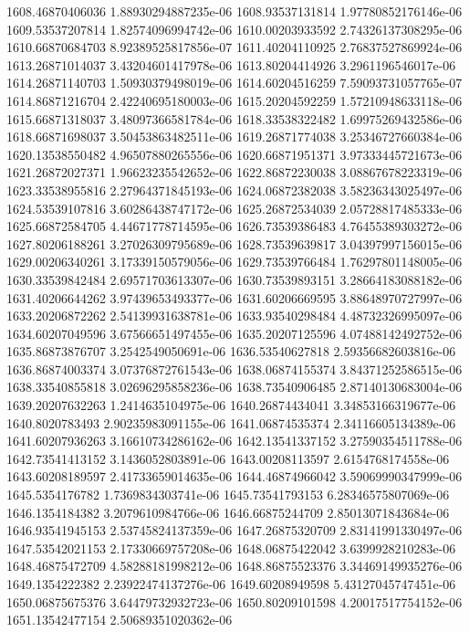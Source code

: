 {1608.46870406036 1.88930294887235e-06
1608.93537131814 1.97780852176146e-06
1609.53537207814 1.82574096994742e-06
1610.00203933592 2.74326137308295e-06
1610.66870684703 8.92389525817856e-07
1611.40204110925 2.76837527869924e-06
1613.26871014037 3.43204601417978e-06
1613.80204414926 3.2961196546017e-06
1614.26871140703 1.50930379498019e-06
1614.60204516259 7.59093731057765e-07
1614.86871216704 2.42240695180003e-06
1615.20204592259 1.57210948633118e-06
1615.66871318037 3.48097366581784e-06
1618.33538322482 1.69975269432586e-06
1618.66871698037 3.50453863482511e-06
1619.26871774038 3.25346727660384e-06
1620.13538550482 4.96507880265556e-06
1620.66871951371 3.97333445721673e-06
1621.26872027371 1.96623235542652e-06
1622.86872230038 3.08867678223319e-06
1623.33538955816 2.27964371845193e-06
1624.06872382038 3.58236343025497e-06
1624.53539107816 3.60286438747172e-06
1625.26872534039 2.05728817485333e-06
1625.66872584705 4.44671778714595e-06
1626.73539386483 4.76455389303272e-06
1627.80206188261 3.27026309795689e-06
1628.73539639817 3.04397997156015e-06
1629.00206340261 3.17339150579056e-06
1629.73539766484 1.76297801148005e-06
1630.33539842484 2.69571703613307e-06
1630.73539893151 3.28664183088182e-06
1631.40206644262 3.97439653493377e-06
1631.60206669595 3.88648970727997e-06
1633.20206872262 2.54139931638781e-06
1633.93540298484 4.48732326995097e-06
1634.60207049596 3.67566651497455e-06
1635.20207125596 4.07488142492752e-06
1635.86873876707 3.2542549050691e-06
1636.53540627818 2.59356682603816e-06
1636.86874003374 3.07376872761543e-06
1638.06874155374 3.84371252586515e-06
1638.33540855818 3.02696295858236e-06
1638.73540906485 2.87140130683004e-06
1639.20207632263 1.2414635104975e-06
1640.26874434041 3.34853166319677e-06
1640.8020783493 2.90235983091155e-06
1641.06874535374 2.34116605134389e-06
1641.60207936263 3.16610734286162e-06
1642.13541337152 3.27590354511788e-06
1642.73541413152 3.1436052803891e-06
1643.00208113597 2.6154768174558e-06
1643.60208189597 2.41733659014635e-06
1644.46874966042 3.59069990347999e-06
1645.5354176782 1.7369834303741e-06
1645.73541793153 6.28346575807069e-06
1646.1354184382 3.2079610984766e-06
1646.66875244709 2.85013071843684e-06
1646.93541945153 2.53745824137359e-06
1647.26875320709 2.83141991330497e-06
1647.53542021153 2.17330669757208e-06
1648.06875422042 3.6399928210283e-06
1648.46875472709 4.58288181998212e-06
1648.86875523376 3.34469149935276e-06
1649.1354222382 2.23922474137276e-06
1649.60208949598 5.43127045747451e-06
1650.06875675376 3.64479732932723e-06
1650.80209101598 4.20017517754152e-06
1651.13542477154 2.50689351020362e-06
}
